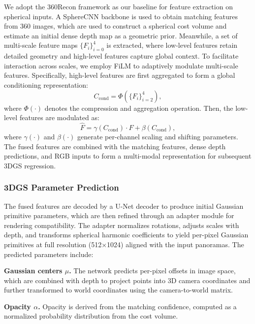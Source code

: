 We adopt the 360Recon framework as our baseline for feature extraction on spherical inputs. 
A SphereCNN backbone is used to obtain matching features from 360 images, which are used to construct a spherical cost volume and estimate an initial dense depth map as a geometric prior. 
Meanwhile, a set of multi-scale feature maps $\{{F_i}\}_{i=0}^{4}$ is extracted, where low-level features retain detailed geometry and high-level features capture global context.
To facilitate interaction across scales, we employ FiLM to adaptively modulate multi-scale features.
Specifically, high-level features are first aggregated to form a global conditioning representation:
\begin{equation}\label{equ:1}
    C_{\mathrm{cond}} = \Phi\left(\{ F_i \}_{i=2}^{4} \right),
\end{equation}
where $\Phi(\cdot)$ denotes the compression and aggregation operation. 
Then, the low-level features are modulated as:
\begin{equation}\label{equ:2}
    \hat{F} = \gamma(C_{\mathrm{cond}}) \cdot F + \beta(C_{\mathrm{cond}}),
\end{equation}
where $\gamma(\cdot)$ and $\beta(\cdot)$ generate per-channel scaling and shifting parameters. 
The fused features are combined with the matching features, dense depth predictions, and RGB inputs to form a multi-modal representation for subsequent 3DGS regression.

\subsubsection{3DGS Parameter Prediction}\label{sec:prediction}

The fused features are decoded by a U-Net decoder to produce initial Gaussian primitive parameters, which are then refined through an adapter module for rendering compatibility.
The adapter normalizes rotations, adjusts scales with depth, and transforms spherical harmonic coefficients to yield per-pixel Gaussian primitives at full resolution (512×1024) aligned with the input panoramas.
The predicted parameters include:

\textbf{Gaussian centers $\mu$.} 
The network predicts per-pixel offsets in image space, which are combined with depth to project points into 3D camera coordinates and further transformed to world coordinates using the camera-to-world matrix.

\textbf{Opacity $\alpha$.} 
Opacity is derived from the matching confidence, computed as a normalized probability distribution from the cost volume.

